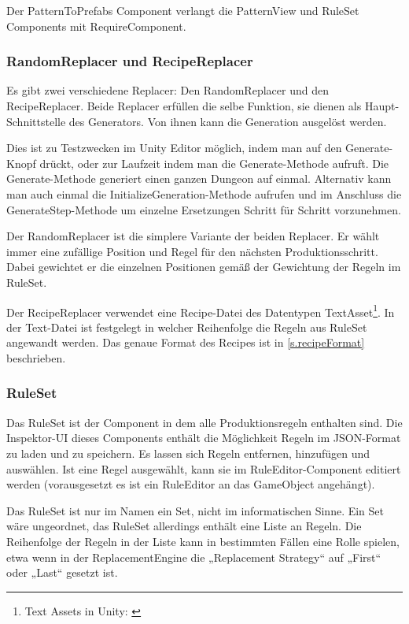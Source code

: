 Der PatternToPrefabs Component verlangt die PatternView und RuleSet Components mit RequireComponent.

\subsubsection{RandomReplacer und RecipeReplacer}

Es gibt zwei verschiedene Replacer: Den RandomReplacer und den RecipeReplacer. Beide Replacer erfüllen die selbe Funktion, sie dienen als Haupt-Schnittstelle des Generators. Von ihnen kann die Generation ausgelöst werden.

Dies ist zu Testzwecken im Unity Editor möglich, indem man auf den Generate-Knopf drückt, oder zur Laufzeit indem man die Generate-Methode aufruft. Die Generate-Methode generiert einen ganzen Dungeon auf einmal. Alternativ kann man auch einmal die InitializeGeneration-Methode aufrufen und im Anschluss die GenerateStep-Methode um einzelne Ersetzungen Schritt für Schritt vorzunehmen.

Der RandomReplacer ist die simplere Variante der beiden Replacer. Er wählt immer eine zufällige Position und Regel für den nächsten Produktionsschritt. Dabei gewichtet er die einzelnen Positionen gemäß der Gewichtung der Regeln im RuleSet.

Der RecipeReplacer verwendet eine Recipe-Datei des Datentypen TextAsset\footnote{Text Assets in Unity: \cite[Seite: class-TextAsset]{unityManual}}. In der Text-Datei ist festgelegt in welcher Reihenfolge die Regeln aus RuleSet angewandt werden. Das genaue Format des Recipes ist in \ref{s.recipeFormat} beschrieben.

\subsubsection{RuleSet}

Das RuleSet ist der Component in dem alle Produktionsregeln enthalten sind. Die Inspektor-UI dieses Components enthält die Möglichkeit Regeln im JSON-Format zu laden und zu speichern. Es lassen sich Regeln entfernen, hinzufügen und auswählen. Ist eine Regel ausgewählt, kann sie im RuleEditor-Component editiert werden (vorausgesetzt es ist ein RuleEditor an das GameObject angehängt).

Das RuleSet ist nur im Namen ein Set, nicht im informatischen Sinne. Ein Set wäre ungeordnet, das RuleSet allerdings enthält eine Liste an Regeln. Die Reihenfolge der Regeln in der Liste kann in bestimmten Fällen eine Rolle spielen, etwa wenn in der ReplacementEngine die „Replacement Strategy“ auf „First“ oder „Last“ gesetzt ist.

